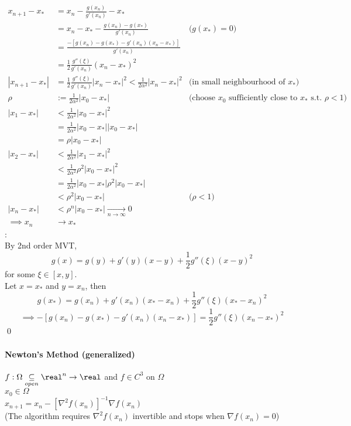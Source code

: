 \documentclass[11pt]{article}
\begin{document}
\begin{align}
	x_{n+1} - x_* &= x_n - \frac{g(x_n)}{g'(x_n)} - x_* \\
	&= x_n - x_* - \frac{g(x_n) - g(x_*)}{g'(x_n)} &\text{($g(x_*) = 0$)}\\
	&= \frac{-[g(x_n) - g(x_*) - g'(x_n)(x_n - x_*)]}{g'(x_n)} \\
	&= \frac{1}{2}\frac{g''(\xi)}{g'(x_n)}(x_n - x_*)^2 \\
	|x_{n+1} - x_*| &= \frac{1}{2}\frac{g''(\xi)}{g'(x_n)}|x_n - x_*|^2 < \frac{1}{2\alpha^2}|x_n - x_*|^2 &\text{(in small neighbourhood of $x_*$)} \\
	\rho &:= \frac{1}{2\alpha^2} |x_0 - x_*| &\text{(choose $x_0$ sufficiently close to $x_*$ s.t. $\rho < 1$)} \\
	|x_1 - x_*| &< \frac{1}{2\alpha^2}|x_0 - x_*|^2 \\
	&= \frac{1}{2\alpha^2}|x_0 - x_*||x_0 - x_*| \\
	&= \rho|x_0 - x_*| \\
	|x_2 - x_*| &< \frac{1}{2\alpha^2}|x_1 - x_*|^2 \\
	&< \frac{1}{2\alpha^2}\rho^2|x_0 - x_*|^2 \\
	&= \frac{1}{2\alpha^2}|x_0 - x_*| \rho^2 |x_0 - x_*| \\
	&< \rho^2 |x_0 - x_*| &\text{($\rho < 1$)} \\
	|x_n - x_*| &< \rho^n |x_0 - x_*| \underset{n \rightarrow \infty}{\rightarrow} 0 \\
	\implies x_n &\rightarrow x_*
\end{align}
: \\
By 2nd order MVT,
$$g(x) = g(y) + g'(y)(x-y) + \frac{1}{2}g''(\xi) (x-y)^2$$
for some $\xi \in [x, y]$. \\
Let $x = x_*$ and $y = x_n$, then
$$g(x_*) = g(x_n) + g'(x_n)(x_* - x_n) + \frac{1}{2}g''(\xi)(x_* - x_n)^2$$
$$\implies -[g(x_n) - g(x_*) - g'(x_n)(x_n - x_*)] = \frac{1}{2}g''(\xi)(x_n - x_*)^2 $$
\qed
\paragraph{Newton's Method (generalized)}
$f: \Omega \underset{open}{\subseteq} \real^n \rightarrow \real$ and $f \in C^3$ on $\Omega$ \\
$x_0 \in \Omega$ \\
$x_{n+1} = x_n - [\nabla^2 f(x_n)]^{-1} \nabla f(x_n)$ \\
(The algorithm requires $\nabla^2 f(x_n)$ invertible and stops when $\nabla f(x_n) = 0$)
\end{document}
